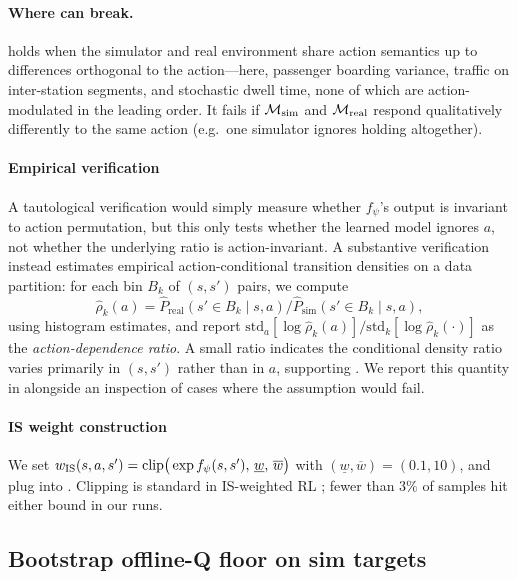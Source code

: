 \paragraph{Where  can break.}
 holds when the simulator and real environment share action semantics up to differences orthogonal to the action---here, passenger boarding variance, traffic on inter-station segments, and stochastic dwell time, none of which are action-modulated in the leading order.
It fails if $\mathcal{M}_{\mathrm{sim}}$ and $\mathcal{M}_{\mathrm{real}}$ respond qualitatively differently to the same action (e.g.\ one simulator ignores holding altogether).

\paragraph{Empirical verification}
A tautological verification would simply measure whether $f_\psi$'s output is invariant to action permutation, but this only tests whether the learned model ignores $a$, not whether the underlying ratio is action-invariant.
A substantive verification instead estimates empirical action-conditional transition densities on a data partition: for each bin $B_k$ of $(s, s')$ pairs, we compute
\begin{equation}
\hat{\rho}_k(a) = \hat{P}_{\text{real}}(s' \in B_k \mid s, a) / \hat{P}_{\text{sim}}(s' \in B_k \mid s, a),
\label{eq:rho_hat}
\end{equation}
using histogram estimates, and report $\mathrm{std}_a[\log \hat{\rho}_k(a)] / \mathrm{std}_{k}[\log \hat{\rho}_k(\cdot)]$ as the \emph{action-dependence ratio}.
A small ratio indicates the conditional density ratio varies primarily in $(s, s')$ rather than in $a$, supporting .
We report this quantity in  alongside an inspection of cases where the assumption would fail.

\paragraph{IS weight construction}
We set $w_{\mathrm{IS}}(s, a, s') = \mathrm{clip}\big(\exp f_\psi(s, s'),\, \underline{w},\, \overline{w}\big)$ with $(\underline{w}, \overline{w}) = (0.1, 10)$, and plug into .
Clipping is standard in IS-weighted RL \citep{eysenbach2021off}; fewer than $3\%$ of samples hit either bound in our runs.

\subsection{Bootstrap offline-Q floor on sim targets}
\label{sec:method:floor}

